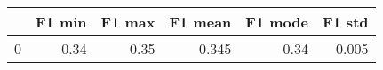 \begin{tabular}{lrrrrr}
\toprule
{} &  F1 min &  F1 max &  F1 mean &  F1 mode &  F1 std \\
\midrule
0 &    0.34 &    0.35 &    0.345 &     0.34 &   0.005 \\
\bottomrule
\end{tabular}
